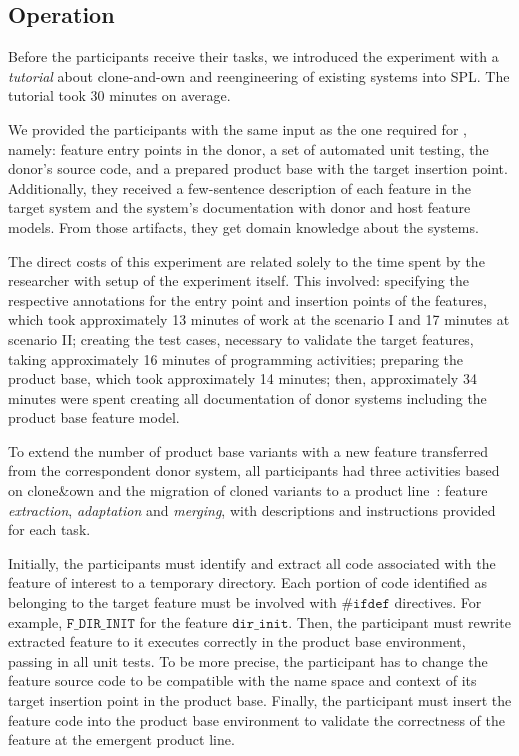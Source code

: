 \subsection{Operation}

Before the participants receive their tasks, we introduced the experiment with a \emph{tutorial} about clone-and-own and reengineering of existing systems into SPL. The tutorial took 30 minutes on average.

We provided the participants with the same input as the one required for \FOUNDRY, namely: feature entry points in the donor, a set of automated unit testing, the donor’s source code, and a prepared product base with the target insertion point. Additionally, they received a few-sentence description of each feature in the target system and the system’s documentation with donor and host feature models. From those artifacts, they get domain knowledge about the systems. 

The direct costs of this experiment are related solely to the time spent by the researcher with setup of the experiment itself. This involved: specifying the respective annotations for the entry point and insertion points of the features, which took approximately 13 minutes of work at the scenario I and 17 minutes at scenario II; creating the test cases, necessary to validate the target features, taking approximately 16 minutes of programming activities; preparing the product base, which took approximately 14 minutes; then, approximately 34 minutes were spent creating all documentation of donor systems including the product base feature model.

To extend the number of product base variants with a new feature transferred from the correspondent donor system, all participants had three activities based on clone\&own and the migration of cloned variants to a product line~\cite{Krueger2001,Mahmood2021}: feature \emph{extraction}, \emph{adaptation} and \emph{merging}, with descriptions and instructions provided for each task.  

Initially, the participants must identify and extract all code associated with the feature of interest to a temporary directory. Each portion of code identified as belonging to the target feature must be involved with $\texttt{\#ifdef}$ directives. For example, $\texttt{F\_DIR\_INIT}$ for the feature $\texttt{dir\_init}$. Then, the participant must rewrite extracted feature to it executes correctly in the product base environment, passing in all unit tests. To  be  more  precise, the participant has to change the feature source code to be compatible with the name space and context of its target insertion point in the product base. Finally, the participant must insert the feature code into the product base environment to validate the correctness of the feature at the emergent product line. 

